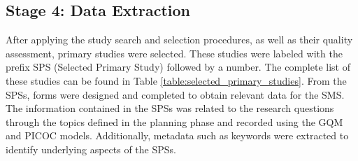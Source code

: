\subsection{Stage 4: Data Extraction}\label{sec:extraccion-de-datos}
After applying the study search and selection procedures, as well as their quality assessment, \totalEtapaDos{} primary studies were selected. These studies were labeled with the prefix SPS (Selected Primary Study) followed by a number. The complete list of these studies can be found in Table \ref{table:selected_primary_studies}.
From the \totalEtapaDos{} SPSs, forms were designed and completed to obtain relevant data for the SMS. The information contained in the SPSs was related to the research questions through the topics defined in the planning phase and recorded using the GQM and PICOC models. Additionally, metadata such as keywords were extracted to identify underlying aspects of the SPSs.

